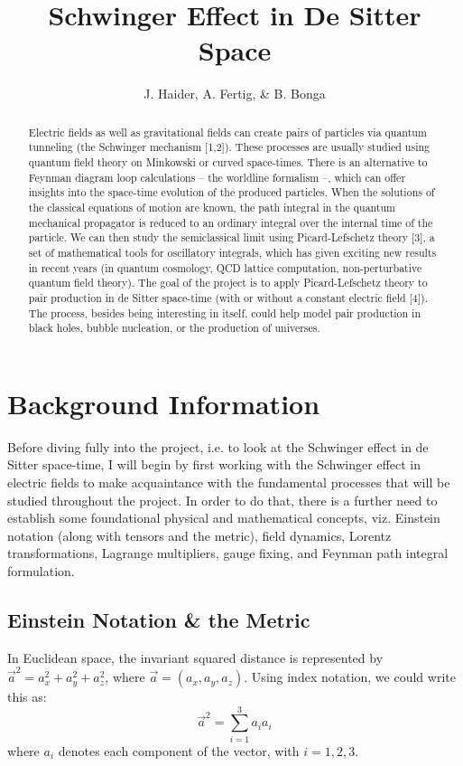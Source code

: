 \documentclass{emulateapj}
\begin{document}
\title{Schwinger Effect in De Sitter Space}

\author{J. Haider, A. Fertig, \& B. Bonga}




\begin{abstract}
Electric fields as well as gravitational fields can create pairs of particles via quantum tunneling (the Schwinger mechanism [1,2]). These processes are usually studied using quantum field theory on Minkowski or curved space-times. There is an alternative to Feynman diagram loop calculations -- the worldline formalism --, which can offer insights into the space-time evolution of the produced particles.
When the solutions of the classical equations of motion are known, the path integral in the quantum mechanical propagator is reduced to an ordinary integral over the internal time of the particle. We can then study the semiclassical limit using Picard-Lefschetz theory [3], a set of mathematical tools for oscillatory integrals, which has given exciting new results in recent years (in quantum cosmology, QCD lattice computation, non-perturbative quantum field theory). 
The goal of the project is to apply Picard-Lefschetz theory to pair production in de Sitter space-time (with or without a constant electric field [4]). The process, besides being interesting in itself, could help model pair production in black holes, bubble nucleation, or the production of universes.

\end{abstract}

\section{Background Information} \label{background}
Before diving fully into the project, i.e. to look at the Schwinger effect in de Sitter space-time, I will begin by first working with the Schwinger effect in electric fields to make acquaintance with the fundamental processes that will be studied throughout the project. In order to do that, there is a further need to establish some foundational physical and mathematical concepts, viz. Einstein notation (along with tensors and the metric), field dynamics, Lorentz transformations, Lagrange multipliers, gauge fixing, and Feynman path integral formulation.

\subsection{Einstein Notation \& the Metric} \label{einstein}
In Euclidean space, the invariant squared distance is represented by $\vec{a}^2=a_x^2 + a_y^2 + a_z^2$, where $\vec{a}=(a_x,a_y,a_z)$. Using index notation, we could write this as:
\[ \vec{a}^2 = \sum_{i=1}^{3} a_ia_i\]
where $a_i$ denotes each component of the vector, with $i=1,2,3$.
\end{document}
